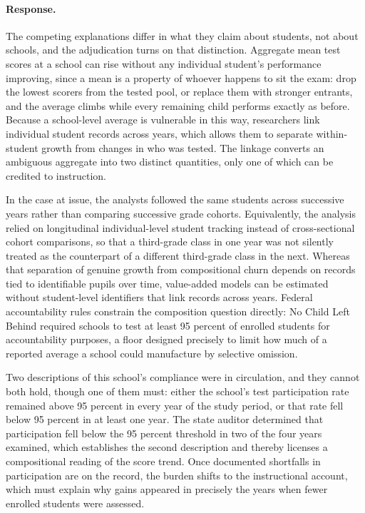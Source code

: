 \documentclass[11pt]{article}
\begin{document}
\paragraph{Response.} {\small The competing explanations differ in what they claim about students, not about schools, and the adjudication turns on that distinction. Aggregate mean test scores at a school can rise without any individual student's performance improving, since a mean is a property of whoever happens to sit the exam: drop the lowest scorers from the tested pool, or replace them with stronger entrants, and the average climbs while every remaining child performs exactly as before. Because a school-level average is vulnerable in this way, researchers link individual student records across years, which allows them to separate within-student growth from changes in who was tested. The linkage converts an ambiguous aggregate into two distinct quantities, only one of which can be credited to instruction.

In the case at issue, the analysts followed the same students across successive years rather than comparing successive grade cohorts. Equivalently, the analysis relied on longitudinal individual-level student tracking instead of cross-sectional cohort comparisons, so that a third-grade class in one year was not silently treated as the counterpart of a different third-grade class in the next. Whereas that separation of genuine growth from compositional churn depends on records tied to identifiable pupils over time, value-added models can be estimated without student-level identifiers that link records across years. Federal accountability rules constrain the composition question directly: No Child Left Behind required schools to test at least 95 percent of enrolled students for accountability purposes, a floor designed precisely to limit how much of a reported average a school could manufacture by selective omission.

Two descriptions of this school's compliance were in circulation, and they cannot both hold, though one of them must: either the school's test participation rate remained above 95 percent in every year of the study period, or that rate fell below 95 percent in at least one year. The state auditor determined that participation fell below the 95 percent threshold in two of the four years examined, which establishes the second description and thereby licenses a compositional reading of the score trend. Once documented shortfalls in participation are on the record, the burden shifts to the instructional account, which must explain why gains appeared in precisely the years when fewer enrolled students were assessed.

}
\end{document}
